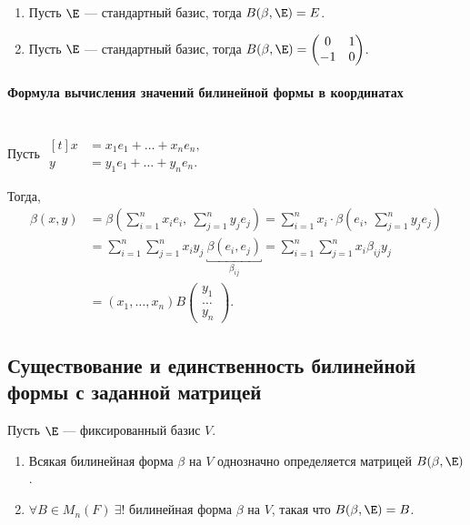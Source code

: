 \begin{enumerate}
\item Пусть $\E$ --- стандартный базис, тогда $B(\beta, \E) = E$.
\item Пусть $\E$ --- стандартный базис, тогда $B(\beta, \E) = \begin{pmatrix} 0 & 1 \\ -1 & 0 \end{pmatrix}$.
\end{enumerate}

\paragraph{Формула вычисления значений билинейной формы в координатах}~\\

Пусть
\begin{math}
    \begin{aligned}[t]
        x &= x_1 e_1 + \dots + x_n e_n, \\
        y &= y_1 e_1 + \dots + y_n e_n.
    \end{aligned}
\end{math}

Тогда,
\begin{align*}
    \beta(x, y)
    &= \beta\left(\sum_{i = 1}^{n} x_i e_i, \ \sum_{j = 1}^{n} y_j e_j\right)
    = \sum_{i = 1}^{n} x_i \cdot \beta\left(e_i, \ \sum_{j = 1}^{n} y_j e_j\right) \\
    &= \sum_{i = 1}^{n} \sum_{j = 1}^{n} x_i y_j \  \underbracket{\beta(e_i, e_j)}_{\beta_{ij}}
    = \sum_{i = 1}^{n} \sum_{j = 1}^{n} x_i \beta_{ij} y_j  \\
    &= (x_1, \dots, x_n) B \begin{pmatrix} y_1 \\ \dots \\ y_n \end{pmatrix}
.\end{align*}


\subsection{Существование и единственность билинейной формы с заданной матрицей}

\begin{proposal}
    Пусть $\E$ --- фиксированный базис $V$.
    \begin{enumerate}
    \item Всякая билинейная форма $\beta$ на $V$ однозначно определяется матрицей $B(\beta, \E)$.
    \item $\forall B \in M_n(F) \ \exists!$ билинейная форма $\beta$ на $V$, такая что $B(\beta, \E) = B$.
    \end{enumerate}
\end{proposal}

